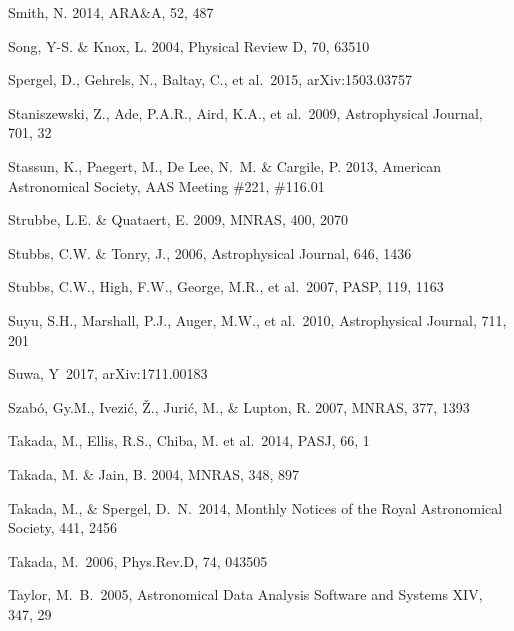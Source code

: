 \documentclass[twocolumn]{aastex61}
\begin{document}
\begin{thebibliography}{}
 Smith, N. 2014, ARA\&A, 52, 487

 Song, Y-S. \& Knox, L. 2004, Physical Review D, 70, 63510

 Spergel, D., Gehrels, N., Baltay, C., et al.~2015, arXiv:1503.03757



 Staniszewski, Z., Ade, P.A.R., Aird, K.A., et al.~2009,  Astrophysical  Journal, 701, 32

 Stassun, K., Paegert, M., De Lee, N.~M. \& Cargile, P. 2013, American Astronomical Society, AAS Meeting \#221, \#116.01

 Strubbe, L.E. \& Quataert, E. 2009, MNRAS, 400, 2070

 Stubbs, C.W. \& Tonry, J., 2006, Astrophysical Journal, 646, 1436

 Stubbs, C.W., High, F.W., George, M.R., et al.~2007, PASP, 119, 1163

 Suyu, S.H., Marshall, P.J., Auger, M.W., et al.~2010, Astrophysical Journal, 711, 201

 Suwa, Y~2017, arXiv:1711.00183

 Szab\'o, Gy.M., Ivezi\'c, \v{Z}., Juri\'c, M., \& Lupton, R. 2007, MNRAS, 377, 1393

 Takada, M., Ellis, R.S., Chiba, M. et al.~2014, PASJ, 66, 1

 Takada, M. \& Jain, B. 2004, MNRAS, 348, 897

 Takada, M., \& Spergel, D.~N.~2014, Monthly Notices of the Royal Astronomical Society, 441, 2456

 Takada, M.\ 2006, Phys.Rev.D, 74, 043505

 Taylor, M.~B.\ 2005, Astronomical Data Analysis Software and Systems XIV, 347, 29


\end{thebibliography}
\end{document}
